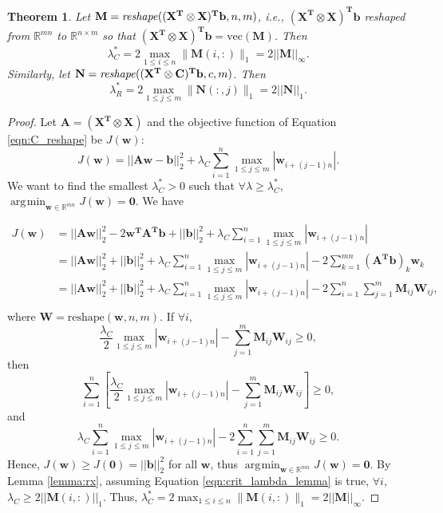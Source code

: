 \documentclass[12pt]{article}
\newtheorem{theorem}{Theorem}[section]
\DeclareMathOperator*{\argmin}{\arg\!\min}
\begin{document}
\begin{theorem}
Let $\mathbf{M} = \text{\emph{reshape}}(\mathbf{(X^T \otimes X)^Tb}, n, m)$, i.e., $\mathbf{(X^T \otimes X)^Tb}$ reshaped from $\mathbb{R}^{mn}$ to $\mathbb{R}^{n \times m}$ so that $\mathbf{(X^T \otimes X)^Tb} = \text{vec}(\mathbf{M})$.  Then 
\[
\lambda_C^* = 2 \max_{1 \leq i \leq n} \| \mathbf{M}(i,:) \|_1 = 2||\mathbf{M}||_\infty.
\]
Similarly, let $\mathbf{N} = \text{\emph{reshape}}(\mathbf{(X^T \otimes C)^Tb}, c, m)$.  Then 
\[
\lambda_R^* = 2 \max_{1 \leq j \leq m} \| \mathbf{N}(:,j) \|_1 = 2||\mathbf{N}||_1. 
\] 
\end{theorem}

\begin{proof}
Let $\mathbf{A} = \mathbf{(X^T \otimes X)}$ and the objective function of Equation \ref{eqn:C_reshape} be $J(\mathbf{w})$:
\[
J(\mathbf{w}) = ||\mathbf{Aw}-\mathbf{b}||^2_2 + \lambda_C \sum_{i=1}^n \max_{1 \leq j \leq m} |\mathbf{w}_{i+(j-1)n}|.
\]
We want to find the smallest $\lambda_C^* > 0$ such that $\forall \lambda \geq \lambda_C^*$, $\argmin_{\mathbf{w} \in \mathbb{R}^{mn}} J(\mathbf{w}) = \mathbf{0}$.  We have

\begin{equation*}
\begin{split}
J(\mathbf{w}) & = ||\mathbf{Aw}||^2_2 - 2\mathbf{w^TA^Tb} + ||\mathbf{b}||^2_2 + \lambda_C \sum_{i=1}^n \max_{1 \leq j \leq m} |\mathbf{w}_{i+(j-1)n}| \\
& = ||\mathbf{Aw}||^2_2 + ||\mathbf{b}||^2_2  + \lambda_C \sum_{i=1}^n \max_{1 \leq j \leq m} |\mathbf{w}_{i+(j-1)n}| - 2 \sum_{k=1}^{mn} (\mathbf{A^Tb})_k \mathbf{w}_k \\
& = ||\mathbf{Aw}||^2_2 + ||\mathbf{b}||^2_2  + \lambda_C \sum_{i=1}^n \max_{1 \leq j \leq m} |\mathbf{w}_{i+(j-1)n}| - 2 \sum_{i=1}^{n} \sum_{j=1}^{m} \mathbf{M}_{ij} \mathbf{W}_{ij}, \\
\end{split}
\end{equation*}
where $\mathbf{W} = \text{reshape}(\mathbf{w}, n, m)$.  If $\forall i$, 
\begin{equation}
\label{eqn:crit_lambda_lemma}
\frac{\lambda_C}{2} \max_{1 \leq j \leq m} |\mathbf{w}_{i+(j-1)n}| - \sum_{j=1}^{m} \mathbf{M}_{ij} \mathbf{W}_{ij} \geq 0,
\end{equation}
then 
\[
\sum_{i=1}^n \left[ \frac{\lambda_C}{2} \max_{1 \leq j \leq m} |\mathbf{w}_{i+(j-1)n}| - \sum_{j=1}^{m} \mathbf{M}_{ij} \mathbf{W}_{ij} \right] \geq 0, 
\]
and 
\[
\lambda_C \sum_{i=1}^n \max_{1 \leq j \leq m} |\mathbf{w}_{i+(j-1)n}| - 2 \sum_{i=1}^{n} \sum_{j=1}^{m} \mathbf{M}_{ij} \mathbf{W}_{ij} \geq 0.
\]
Hence, $J(\mathbf{w}) \geq J(\mathbf{0}) = ||\mathbf{b}||^2_2$ for all $\mathbf{w}$, thus $\argmin_{\mathbf{w} \in \mathbb{R}^{mn}} J(\mathbf{w}) = \mathbf{0}$.  By Lemma \ref{lemma:rx}, assuming Equation \ref{eqn:crit_lambda_lemma} is true, $\forall i$, $\lambda_C \geq 2||\mathbf{M}(i,:)||_1$.  Thus, $\lambda_C^* = 2 \max_{1 \leq i \leq n} \| \mathbf{M}(i,:) \|_1 = 2||\mathbf{M}||_\infty$.   


\end{proof}
\end{document}
